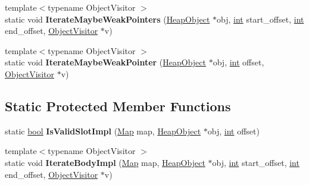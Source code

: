 \begin{DoxyCompactItemize}
\item 
\mbox{\label{classv8_1_1internal_1_1BodyDescriptorBase_a44dfbdf9e52eb4b1909fbd520f115a9a}} 
{\footnotesize template$<$typename Object\+Visitor $>$ }\\static void {\bfseries Iterate\+Maybe\+Weak\+Pointers} (\mbox{\hyperlink{classv8_1_1internal_1_1HeapObject}{Heap\+Object}} $\ast$obj, \mbox{\hyperlink{classint}{int}} start\+\_\+offset, \mbox{\hyperlink{classint}{int}} end\+\_\+offset, \mbox{\hyperlink{classv8_1_1internal_1_1ObjectVisitor}{Object\+Visitor}} $\ast$v)
\item 
\mbox{\label{classv8_1_1internal_1_1BodyDescriptorBase_aa26f0e643e2cafd13dc6378699eaf6cb}} 
{\footnotesize template$<$typename Object\+Visitor $>$ }\\static void {\bfseries Iterate\+Maybe\+Weak\+Pointer} (\mbox{\hyperlink{classv8_1_1internal_1_1HeapObject}{Heap\+Object}} $\ast$obj, \mbox{\hyperlink{classint}{int}} offset, \mbox{\hyperlink{classv8_1_1internal_1_1ObjectVisitor}{Object\+Visitor}} $\ast$v)
\end{DoxyCompactItemize}
\subsection*{Static Protected Member Functions}
\begin{DoxyCompactItemize}
\item 
\mbox{\label{classv8_1_1internal_1_1BodyDescriptorBase_aa149c97649d4700b21809877825b0f52}} 
static \mbox{\hyperlink{classbool}{bool}} {\bfseries Is\+Valid\+Slot\+Impl} (\mbox{\hyperlink{classv8_1_1internal_1_1Map}{Map}} map, \mbox{\hyperlink{classv8_1_1internal_1_1HeapObject}{Heap\+Object}} $\ast$obj, \mbox{\hyperlink{classint}{int}} offset)
\item 
\mbox{\label{classv8_1_1internal_1_1BodyDescriptorBase_abe9b03513e19eac33595489c07d0743c}} 
{\footnotesize template$<$typename Object\+Visitor $>$ }\\static void {\bfseries Iterate\+Body\+Impl} (\mbox{\hyperlink{classv8_1_1internal_1_1Map}{Map}} map, \mbox{\hyperlink{classv8_1_1internal_1_1HeapObject}{Heap\+Object}} $\ast$obj, \mbox{\hyperlink{classint}{int}} start\+\_\+offset, \mbox{\hyperlink{classint}{int}} end\+\_\+offset, \mbox{\hyperlink{classv8_1_1internal_1_1ObjectVisitor}{Object\+Visitor}} $\ast$v)
\end{DoxyCompactItemize}


